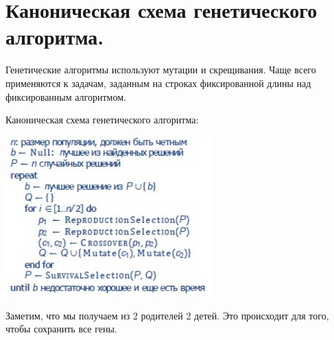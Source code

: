 \section{Каноническая схема генетического алгоритма.}

Генетические алгоритмы используют мутации и скрещивания. Чаще всего применяются к задачам, заданным на строках фиксированной длины над фиксированным алгоритмом. 

Каноническая схема генетического алгоритма:


\includegraphics[width=8cm]{images/13bilet.jpg}  



Заметим, что мы получаем из 2 родителей 2 детей. Это происходит для того, чтобы сохранить все гены.